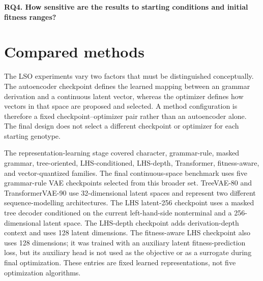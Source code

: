 \textbf{RQ4. How sensitive are the results to starting conditions and initial fitness ranges?}



\section{Compared methods}
\label{sec:Compared methods}

The LSO experiments vary two factors that must be distinguished conceptually. The autoencoder checkpoint defines the learned mapping between an \fone{} grammar derivation and a continuous latent vector, whereas the optimizer defines how vectors in that space are proposed and selected. A method configuration is therefore a fixed checkpoint--optimizer pair rather than an autoencoder alone. The final design does not select a different checkpoint or optimizer for each starting genotype.

The representation-learning stage covered character, grammar-rule, masked grammar, tree-oriented, LHS-conditioned, LHS-depth, Transformer, fitness-aware, and vector-quantized families. The final continuous-space benchmark uses five grammar-rule VAE checkpoints selected from this broader set. TreeVAE-80 and TransformerVAE-90 use 32-dimensional latent spaces and represent two different sequence-modelling architectures. The LHS latent-256 checkpoint uses a masked tree decoder conditioned on the current left-hand-side nonterminal and a 256-dimensional latent space. The LHS-depth checkpoint adds derivation-depth context and uses 128 latent dimensions. The fitness-aware LHS checkpoint also uses 128 dimensions; it was trained with an auxiliary latent fitness-prediction loss, but its auxiliary head is not used as the objective or as a surrogate during final optimization. These entries are fixed learned representations, not five optimization algorithms.


